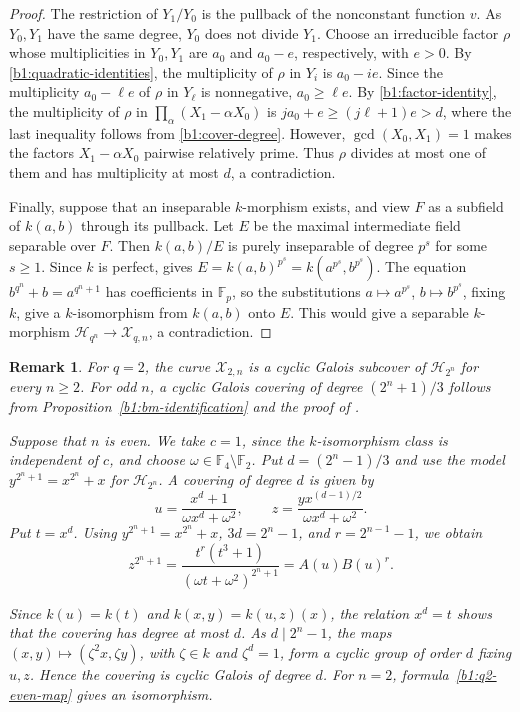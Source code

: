 \documentclass[10pt,a4paper]{amsart}
\numberwithin{equation}{section}
\newcommand{\F}{\mathbb F}
\newtheorem{remark}[theorem]{Remark}
\begin{document}
\begin{proof}
The restriction of \(Y_1/Y_0\) is the pullback of the nonconstant
function \(v\). As \(Y_0,Y_1\) have the same degree,
\(Y_0\) does not divide \(Y_1\). Choose an irreducible factor
\(\rho\) whose multiplicities in \(Y_0,Y_1\) are \(a_0\) and
\(a_0-e\), respectively, with \(e>0\).
By \eqref{b1:quadratic-identities}, the multiplicity of \(\rho\)
in \(Y_i\) is \(a_0-ie\). Since the multiplicity \(a_0-\ell e\) of
\(\rho\) in \(Y_\ell\) is nonnegative, \(a_0\ge\ell e\).
By \eqref{b1:factor-identity}, the multiplicity of \(\rho\) in
\(\prod_\alpha(X_1-\alpha X_0)\) is
\(ja_0+e\ge(j\ell+1)e>d\), where the last inequality follows
from \eqref{b1:cover-degree}.
However, \(\gcd(X_0,X_1)=1\) makes the factors
\(X_1-\alpha X_0\) pairwise relatively prime.
Thus \(\rho\) divides at most one of them and has multiplicity
at most \(d\), a contradiction.

Finally, suppose that an inseparable \(k\)-morphism exists, and
view \(F\) as a subfield of \(k(a,b)\) through its pullback.
Let \(E\) be the maximal intermediate field separable over \(F\).
Then \(k(a,b)/E\) is purely inseparable of degree \(p^s\) for
some \(s\ge1\). Since \(k\) is perfect,
\cite[Proposition~3.10.2(c)]{Stichtenoth2009} gives
\(E=k(a,b)^{p^s}=k(a^{p^s},b^{p^s})\).
The equation \(b^{q^n}+b=a^{q^n+1}\) has
coefficients in \(\F_p\), so the substitutions
\(a\mapsto a^{p^s}\), \(b\mapsto b^{p^s}\), fixing \(k\),
give a \(k\)-isomorphism from \(k(a,b)\) onto \(E\).
This would give a separable \(k\)-morphism
\(\mathcal H_{q^n}\to\mathcal X_{q,n}\), a contradiction.
\end{proof}



\begin{remark}
\label{b1:q2-cover}
For \(q=2\), the curve \(\mathcal X_{2,n}\) is a cyclic Galois
subcover of \(\mathcal H_{2^n}\) for every \(n\ge2\).
For odd \(n\), a cyclic Galois covering of degree \((2^n+1)/3\)
follows from Proposition~\ref{b1:bm-identification} and the proof of
\cite[Lemma~2.4]{BM2018}.

Suppose that \(n\) is even. We take \(c=1\), since the
\(k\)-isomorphism class is independent of \(c\), and choose
\(\omega\in\F_4\setminus\F_2\). Put \(d=(2^n-1)/3\) and use
the model \(y^{2^n+1}=x^{2^n}+x\) for \(\mathcal H_{2^n}\).
A covering of degree \(d\) is given by
\begin{equation}
\label{b1:q2-even-map}
 u=\frac{x^d+1}{\omega x^d+\omega^2},\qquad
 z=\frac{yx^{(d-1)/2}}{\omega x^d+\omega^2}.
\end{equation}
Put \(t=x^d\). Using \(y^{2^n+1}=x^{2^n}+x\),
\(3d=2^n-1\), and \(r=2^{n-1}-1\), we obtain
\[
 z^{2^n+1}=\frac{t^r(t^3+1)}{(\omega t+\omega^2)^{2^n+1}}
 =A(u)B(u)^r.
\]

Since \(k(u)=k(t)\) and \(k(x,y)=k(u,z)(x)\), the relation
\(x^d=t\) shows that the covering has degree at most \(d\).
As \(d\mid2^n-1\), the maps
\((x,y)\mapsto(\zeta^2x,\zeta y)\), with
\(\zeta\in k\) and \(\zeta^d=1\), form a cyclic group of order
\(d\) fixing \(u,z\). Hence the covering is cyclic Galois of
degree \(d\).
For \(n=2\), formula~\eqref{b1:q2-even-map} gives an isomorphism.
\end{remark}
\end{document}
